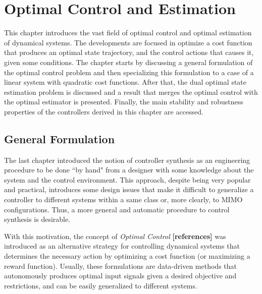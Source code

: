 \documentclass[a4paper,11pt]{book}
\numberwithin{figure}{chapter}
\numberwithin{equation}{chapter}
\numberwithin{table}{chapter}
\theoremstyle{definition}
\begin{document}

\clearpage
\chapter{Optimal Control and Estimation}

This chapter introduces the vast field of optimal control and optimal estimation of dynamical systems. The developments are focused in optimize a cost function that produces an optimal state trajectory, and the control actions that causes it, given some conditions. The chapter starts by discussing a general formulation of the optimal control problem and then specializing this formulation to a case of a linear system with quadratic cost functions. After that, the dual optimal state estimation problem is discussed and a result that merges the optimal control with the optimal estimator is presented. Finally, the main stability and robustness properties of the controllers derived in this chapter are accessed.

\section{General Formulation}

The last chapter introduced the notion of controller synthesis as an engineering procedure to be done ``by hand" from a designer with some knowledge about the system and the control environment. This approach, despite being very popular and practical, introduces some design issues that make it difficult to generalize a controller to different systems within a same class or, more clearly, to MIMO configurations. Thus, a more general and automatic procedure to control synthesis is desirable.

With this motivation, the concept of \textit{Optimal Control} \textbf{[references]} was introduced as an alternative strategy for controlling dynamical systems that determines the necessary action by optimizing a cost function (or maximizing a reward function). Usually, these formulations are data-driven methods that autonomously produces optimal input signals given a desired objective and restrictions, and can be easily generalized to different systems.
\end{document}
